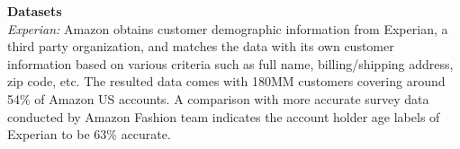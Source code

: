 %

\textbf{Datasets}\\
\textit{Experian:} 
Amazon obtains customer demographic information from Experian, a third party organization, and matches the data with its 
own customer information based on various criteria such as full name, billing/shipping address, zip code, etc. The resulted data comes with 180MM customers covering around 54\% of Amazon US accounts. A comparison with more accurate survey data conducted by Amazon Fashion team indicates the account holder age labels of Experian to be 63\% accurate.

